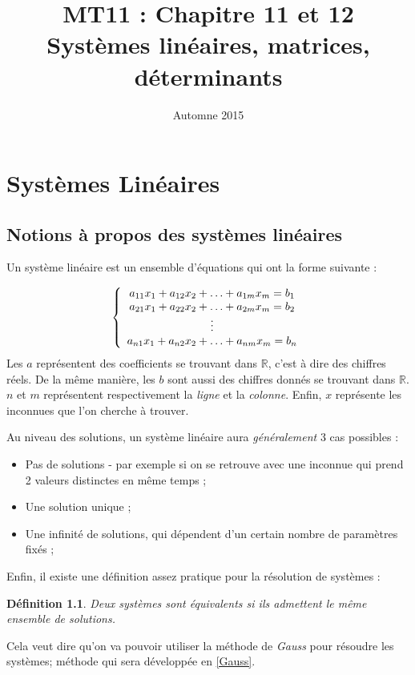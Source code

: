 \documentclass{report}
\title{\textbf{MT11} : Chapitre 11 et 12\\Systèmes linéaires, matrices, déterminants}
\date{Automne 2015}
\newtheorem{mydef}{Définition}
\begin{document}
\maketitle{}

\tableofcontents

\chapter{Systèmes Linéaires}
\section{Notions à propos des systèmes linéaires}
Un système linéaire est un ensemble d'équations qui ont la forme suivante :

\[
\left\{
\begin{array}{c c c}
	a_{11} x_1 + a_{12} x_2 + \ldots + a_{1m} x_m = b_1 \\
	a_{21} x_1 + a_{22} x_2 + \ldots + a_{2m} x_m = b_2 \\
	\vdots \\
	a_{n1} x_1 + a_{n2} x_2 + \ldots + a_{nm} x_m = b_n
\end{array}
\right.
\]
Les $a$ représentent des coefficients se trouvant dans $\mathbb{R}$, c'est à dire des chiffres réels.
De la même manière, les $b$ sont aussi des chiffres donnés se trouvant dans $\mathbb{R}$.
$n$ et $m$ représentent respectivement la \emph{ligne} et la \emph{colonne}.
Enfin, $x$ représente les inconnues que l'on cherche à trouver.\\
\par
Au niveau des solutions, un système linéaire aura \emph{généralement} 3 cas possibles :
\begin{itemize}
	\item{Pas de solutions - par exemple si on se retrouve avec une inconnue qui prend 2 valeurs distinctes en même temps ;}
	\item{Une solution unique ;}
	\item{Une infinité de solutions, qui dépendent d'un certain nombre de paramètres fixés ;}
\end{itemize}
\par
Enfin, il existe une définition assez pratique pour la résolution de systèmes :
\begin{mydef}
Deux systèmes sont équivalents si ils admettent le même ensemble de solutions.
\end{mydef}
Cela veut dire qu'on va pouvoir utiliser la méthode de \emph{Gauss} pour résoudre les systèmes; méthode qui sera développée en \ref{Gauss}.
\end{document}

